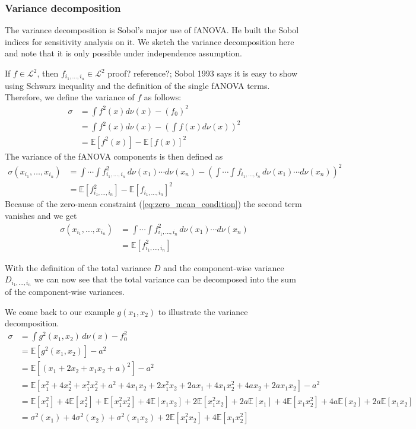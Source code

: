 \subsubsection*{Variance decomposition}
The variance decomposition is Sobol's major use of fANOVA. He built the Sobol indices for sensitivity analysis on it. We sketch the variance decomposition here and note that it is only possible under independence assumption.\par
If $f \in \mathcal{L}^2$, then $f_{i_{1}, \dots, i_{n}} \in \mathcal{L}^2$ {\color{blue}proof? reference?; Sobol 1993 says it is easy to show using Schwarz inequality and the definition of the single fANOVA terms.}
Therefore, we define the variance of $f$ as follows:
\begin{align*}
    \sigma &= \int f^2(x)d\nu (x) - (f_0)^2 \\
    &= \int f^2(x)d\nu (x) - (\int f(x)d\nu (x))^2 \\
    &= \mathbb{E}[f^2(x)] - \mathbb{E}[f(x)]^2
    \label{variance_whole}
\end{align*}
The variance of the fANOVA components is then defined as
\begin{align*}
    \sigma(x_{i_1}, \dots, x_{i_n})
    &= \int \cdots \int f^2_{i_{1}, \dots, i_{n}} \, d\nu(x_1) \cdots d\nu(x_n) - \left( \int \cdots \int f_{i_{1}, \dots, i_{n}} \, d\nu(x_1) \cdots d\nu(x_n) \right)^2\\
    &= \mathbb{E}[f^2_{i_{1}, \dots, i_{n}}] - \mathbb{E}[f_{i_{1}, \dots, i_{n}}]^2
\end{align*}
Because of the zero-mean constraint (\autoref{eq:zero_mean_condition}) the second term vanishes and we get
\begin{align*}
    \sigma(x_{i_1}, \dots, x_{i_n})
    &= \int \cdots \int f^2_{i_{1}, \dots, i_{n}} \, d\nu(x_1) \cdots d\nu(x_n)\\
    &= \mathbb{E}[f^2_{i_{1}, \dots, i_{n}}]
\end{align*}

With the definition of the total variance $D$ and the component-wise variance $D_{i_{1}, \dots, i_{n}}$ we can now see that the total variance can be decomposed into the sum of the component-wise variances.

We come back to our example \( g(x_1, x_2) \) to illustrate the variance decomposition.
\begin{align*}
    \sigma &= \int g^2(x_1, x_2)\, d\nu(x) - f_{0}^2 \\
    &= \mathbb{E}[g^2(x_1, x_2)] - a^2 \\
    &= \mathbb{E}[(x_1 + 2x_2 + x_1x_2 + a)^2] - a^2 \\
    &= \mathbb{E}\left[
        x_1^2 + 4x_2^2 + x_1^2x_2^2 + a^2
        + 4x_1x_2 + 2x_1^2x_2 + 2a x_1
        + 4x_1x_2^2 + 4a x_2 + 2a x_1x_2
    \right] - a^2 \\
    &= \mathbb{E}[x_1^2] + 4\mathbb{E}[x_2^2] + \mathbb{E}[x_1^2x_2^2]
    + 4\mathbb{E}[x_1x_2] + 2\mathbb{E}[x_1^2x_2]
    + 2a\mathbb{E}[x_1] + 4\mathbb{E}[x_1x_2^2]
    + 4a\mathbb{E}[x_2] + 2a\mathbb{E}[x_1x_2] \\
    &= \sigma^2(x_1) + 4\sigma^2(x_2) + \sigma^2(x_1x_2) + 2\mathbb{E}[x_1^2x_2] + 4\mathbb{E}[x_1x_2^2]
\end{align*}

